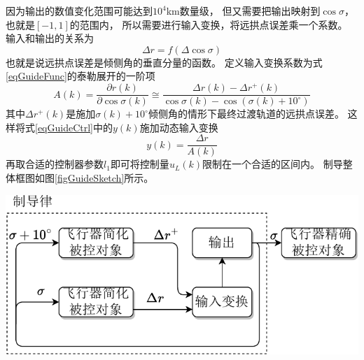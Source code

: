 因为输出的数值变化范围可能达到$10^4$km数量级，
但又需要把输出映射到$\cos\sigma$，也就是$[-1,1]$的范围内，
所以需要进行输入变换，将远拱点误差乘一个系数。
输入和输出的关系为
\begin{equation}
    \Delta r = f(\Delta\cos\sigma) \label{eqGuideFunc}
\end{equation}
也就是说远拱点误差是倾侧角的垂直分量的函数。
定义输入变换系数为式\eqref{eqGuideFunc}的泰勒展开的一阶项
\begin{equation*}
    A(k) = \frac{\partial r(k)}{\partial\cos\sigma(k)}
    \cong \frac{\Delta r(k) - \Delta r^+(k)}{\cos\sigma(k) - \cos(\sigma(k)+10^\circ)}
\end{equation*}
其中$\Delta r^+(k)$是施加$\sigma(k)+10^\circ$倾侧角的情形下最终过渡轨道的远拱点误差。
这样将式\eqref{eqGuideCtrl}中的$y(k)$施加动态输入变换
\[y(k) = \frac{\Delta r}{A(k)}\]
再取合适的控制器参数$l_1$即可将控制量$u_L(k)$限制在一个合适的区间内。
制导整体框图如图\ref{figGuideSketch}所示。
\begin{center}
	\includegraphics[scale=0.7]{GuideSketch.pdf}  \\
	\label{figGuideSketch}
\end{center}

